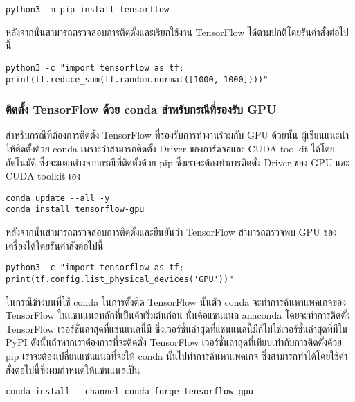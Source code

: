 \begin{lstlisting}[style=MyBash]
python3 -m pip install tensorflow
\end{lstlisting}

หลังจากนั้นสามารถตรวจสอบการติดตั้งและเรียกใช้งาน TensorFlow ได้ตามปกติโดยรันคำสั่งต่อไปนี้

\begin{lstlisting}[style=MyBash]
python3 -c "import tensorflow as tf; print(tf.reduce_sum(tf.random.normal([1000, 1000])))"
\end{lstlisting}

\subsubsection{ติดตั้ง TensorFlow ด้วย conda สำหรับกรณีที่รองรับ GPU}

สำหรับกรณีที่ต้องการติดตั้ง TensorFlow ที่รองรับการทำงานร่วมกับ GPU ด้วยนั้น ผู้เขียนแนะนำให้ติดตั้งด้วย conda เพราะว่าสามารถติดตั้ง Driver
ของการ์ดจอและ CUDA toolkit ได้โดยอัตโนมัติ ซึ่งจะแตกต่างจากกรณีที่ติดตั้งด้วย pip ซึ่งเราจะต้องทำการติดตั้ง Driver ของ GPU และ 
CUDA toolkit เอง

\begin{lstlisting}[style=MyBash]
conda update --all -y
conda install tensorflow-gpu
\end{lstlisting}

หลังจากนั้นสามารถตรวจสอบการติดตั้งและยืนยันว่า TensorFlow สามารถตรวจพบ GPU ของเครื่องได้โดยรันคำสั่งต่อไปนี้

\begin{lstlisting}[style=MyBash]
python3 -c "import tensorflow as tf; print(tf.config.list_physical_devices('GPU'))"
\end{lstlisting}

ในกรณีข้างบนที่ใช้ conda ในการตั้งติด TensorFlow นั้นตัว conda จะทำการค้นหาแพคเกจของ TensorFlow ในแชนแนลหลักที่เป็นค้าเริ่มต้นก่อน
นั่นคือแชนแนล anaconda โดยจะทำการติดตั้ง TensorFlow เวอร์ชั่นล่าสุดที่แชนแนลนี้มี ซึ่งเวอร์ชั่นล่าสุดที่แชนแนลนี้มีก็ไม่ใช่เวอร์ชั่นล่าสุดที่มีใน
PyPI ดังนั้นถ้าหากเราต้องการที่จะติดตั้ง TensorFlow เวอร์ชั่นล่าสุดที่เทียบเท่ากับการติดตั้งด้วย pip เราจะต้องเปลี่ยนแชนแนลที่จะให้ conda
นั้นไปทำการค้นหาแพคเกจ ซึ่งสามารถทำได้โดยใช้คำสั่งต่อไปนี้ซึ่งผมกำหนดให้แชนแนลเป็น 

\begin{lstlisting}[style=MyBash]
    conda install --channel conda-forge tensorflow-gpu
\end{lstlisting}
